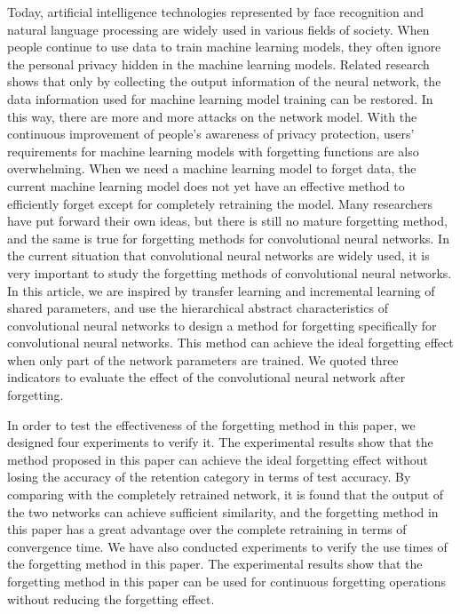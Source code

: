 \begin{abstract*}
  Today, artificial intelligence technologies represented by face recognition and natural language processing are widely used in various fields of society. 
  When people continue to use data to train machine learning models, they often ignore the personal privacy hidden in the machine learning models.
  Related research shows that only by collecting the output information of the neural network, the data information used for machine learning model training can be restored. 
  In this way, there are more and more attacks on the network model. 
  With the continuous improvement of people's awareness of privacy protection, users' requirements for machine learning models with forgetting functions are also overwhelming.
  When we need a machine learning model to forget data, the current machine learning model does not yet have an effective method to efficiently forget except for completely retraining the model.
  Many researchers have put forward their own ideas, but there is still no mature forgetting method, and the same is true for forgetting methods for convolutional neural networks. 
  In the current situation that convolutional neural networks are widely used, it is very important to study the forgetting methods of convolutional neural networks.
  In this article, we are inspired by transfer learning and incremental learning of shared parameters, 
  and use the hierarchical abstract characteristics of convolutional neural networks to design a method for forgetting specifically for convolutional neural networks. 
  This method can achieve the ideal forgetting effect when only part of the network parameters are trained.
  We quoted three indicators to evaluate the effect of the convolutional neural network after forgetting.
  
  In order to test the effectiveness of the forgetting method in this paper, we designed four experiments to verify it. 
  The experimental results show that the method proposed in this paper can achieve the ideal forgetting effect without losing the accuracy of the retention category in terms of test accuracy.
  By comparing with the completely retrained network, 
  it is found that the output of the two networks can achieve sufficient similarity, and the forgetting method in this paper has a great advantage over the complete retraining in terms of convergence time.
  We have also conducted experiments to verify the use times of the forgetting method in this paper. 
  The experimental results show that the forgetting method in this paper can be used for continuous forgetting operations without reducing the forgetting effect.

\end{abstract*}
